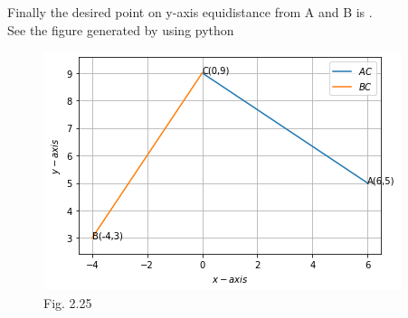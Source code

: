 \documentclass[journal,12pt,twocolumn]{IEEEtran}
\newcommand{\norm}[1]{\left\lVert#1\right\rVert}
\begin{document}



Finally the desired point on y-axis equidistance from A and B is .
 \\
 See the figure generated by using python
     
\begin{figure}[ht]
    \centering
    \includegraphics[width=\columnwidth]{download.png}
    \caption{Fig. 2.25}
    \label{Graphical solution}
\end{figure}
\end{document}

